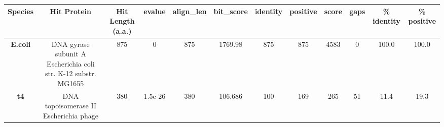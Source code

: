 \begin{tabular}{|c|c|c|c|c|c|c|c|c|c|c|c|} \hline
\textbf{Species} & \textbf{Hit Protein} & \textbf{Hit Length (a.a.)} & \textbf{evalue} & \textbf{align\_len} & \textbf{bit\_score} & \textbf{identity} & \textbf{positive} & \textbf{score} & \textbf{gaps} & \textbf{\% identity} & \textbf{\% positive} \\ \hline
\textbf{E.coli} & DNA gyrase subunit A Escherichia coli str. K-12 substr. MG1655 & 875 & 0 & 875 & 1769.98 & 875 & 875 & 4583 & 0 & 100.0 & 100.0\\
\textbf{t4} & DNA topoisomerase II Escherichia phage  & 380 & 1.5e-26 & 380 & 106.686 & 100 & 169 & 265 & 51 & 11.4 & 19.3\\
\hline \end{tabular}
